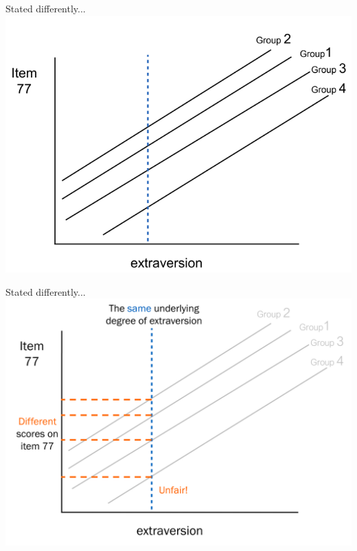 \documentclass[10pt]{beamer}\usepackage[]{graphicx}\usepackage[]{xcolor}
\begin{document}
\begin{frame}{Stated differently...}
    \includegraphics[height=0.8\textheight,keepaspectratio]{slide110.png}
\end{frame}

\begin{frame}{Stated differently...}
    \includegraphics[height=0.8\textheight,keepaspectratio]{images/slide111.png}
\end{frame}
\end{document}

